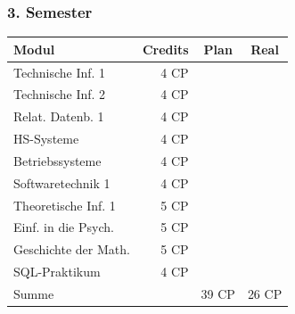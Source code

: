 \subsubsection*{3. Semester}
{
\footnotesize
\begin{tabular}{|l|r|c|c|}
\hline \textbf{Modul}		& \textbf{Credits} 	& \textbf{Plan} & \textbf{Real} \\ 
\hline
\hline Technische Inf. 1 	& 4 CP 				& \nx 			& 	 	\\ 
\hline Technische Inf. 2 	& 4 CP 				& \nx 			& \nx	\\ 
\hline Relat. Datenb. 1 	& 4 CP 				& \nx 			& 	 	\\ 
\hline HS-Systeme 			& 4 CP 				& \nx 			& \nx	\\ 
\hline Betriebssysteme 		& 4 CP 				& \nx 			& 	 	\\ 
\hline Softwaretechnik 1 	& 4 CP 				& \nx 			& \nx	\\ 
\hline Theoretische Inf. 1 	& 5 CP 				& \nx 			& \nx 	\\ 
\hline Einf. in die Psych. 	& 5 CP 				& \nx 			& 	 	\\ 
\hline Geschichte der Math. & 5 CP 				& \nx 			& \nx	\\ 
\hline SQL-Praktikum		& 4 CP 				& 	 			& \nx 	\\ 
\hline
\hline Summe 				&  					& 39 CP 		& 26 CP \\ 
\hline 
\end{tabular}
}

